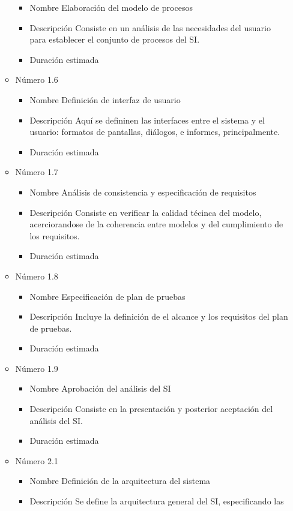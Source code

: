 \documentclass[11pt,a4paper,spanish,twoside]{report}
\begin{document}
\begin{itemize}
\begin{itemize}
\begin{itemize}
\item{Nombre} Elaboración del modelo de procesos
\item{Descripción} Consiste en un análisis de las necesidades del usuario
  para establecer el conjunto de procesos del SI.
\item{Duración estimada} 
\end{itemize}
\item{Número} 1.6
\begin{itemize}
\item{Nombre} Definición de interfaz de usuario
\item{Descripción} Aquí se defininen las interfaces entre el sistema y el 
usuario: formatos de pantallas, diálogos, e informes, principalmente.

\item{Duración estimada} 
\end{itemize}
\item{Número} 1.7
\begin{itemize}
\item{Nombre} Análisis de consistencia y especificación de requisitos
\item{Descripción} Consiste en verificar la calidad técinca del modelo,
  acerciorandose de la coherencia entre modelos y del cumplimiento de los requisitos.
\item{Duración estimada} 
\end{itemize}
\item{Número} 1.8
\begin{itemize}
\item{Nombre} Especificación de plan de pruebas
\item{Descripción} Incluye la definición de el alcance y los requisitos del
  plan de pruebas.
\item{Duración estimada} 
\end{itemize}
\item{Número} 1.9
\begin{itemize}
\item{Nombre} Aprobación del análisis del SI
\item{Descripción} Consiste en la presentación y posterior aceptación del
  análisis del SI.
\item{Duración estimada} 
\end{itemize}
\item{Número} 2.1
\begin{itemize}
\item{Nombre} Definición de la arquitectura del sistema
\item{Descripción} Se define la arquitectura general del SI, especificando las 

\end{itemize}
\end{itemize}
\end{itemize}
\end{document}
